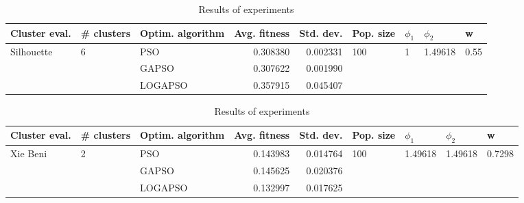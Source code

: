 \documentclass{article}
\begin{document}
\begin{table}
\centering
\caption{Results of experiments}
\begin{tabular}{lllrrllll}
\toprule
              Cluster eval. &        \# clusters & Optim. algorithm &  Avg. fitness &  Std. dev. &            Pop. size &         $\phi_{1}$ &               $\phi_{2}$ &                     w \\
\midrule
\multirow{3}{*}{Silhouette} & \multirow{3}{*}{6} &              PSO &      0.308380 &   0.002331 & \multirow{3}{*}{100} & \multirow{3}{*}{1} & \multirow{3}{*}{1.49618} & \multirow{3}{*}{0.55} \\
                            &                    &            GAPSO &      0.307622 &   0.001990 &                      &                    &                          &                       \\
                            &                    &          LOGAPSO &      0.357915 &   0.045407 &                      &                    &                          &                       \\
\bottomrule
\end{tabular}
\end{table}
\begin{table}
\centering
\caption{Results of experiments}
\begin{tabular}{lllrrllll}
\toprule
            Cluster eval. &        \# clusters & Optim. algorithm &  Avg. fitness &  Std. dev. &            Pop. size &               $\phi_{1}$ &               $\phi_{2}$ &                       w \\
\midrule
\multirow{3}{*}{Xie Beni} & \multirow{3}{*}{2} &              PSO &      0.143983 &   0.014764 & \multirow{3}{*}{100} & \multirow{3}{*}{1.49618} & \multirow{3}{*}{1.49618} & \multirow{3}{*}{0.7298} \\
                          &                    &            GAPSO &      0.145625 &   0.020376 &                      &                          &                          &                         \\
                          &                    &          LOGAPSO &      0.132997 &   0.017625 &                      &                          &                          &                         \\
\bottomrule
\end{tabular}
\end{table}
\end{document}
